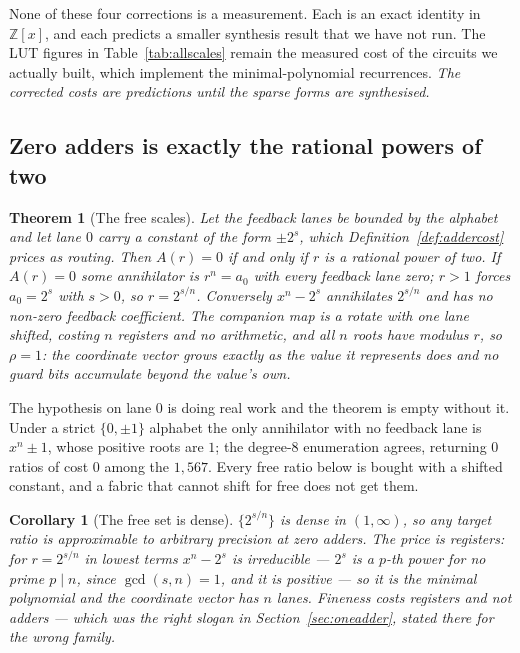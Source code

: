 \documentclass[11pt]{article}
\newtheorem{theorem}{Theorem}
\newtheorem{corollary}{Corollary}
\theoremstyle{definition}
\begin{document}
None of these four corrections is a measurement. Each is an exact identity in
$\mathbb{Z}[x]$, and each predicts a smaller synthesis result that we have not
run. The LUT figures in Table~\ref{tab:allscales} remain the measured cost of
the circuits we actually built, which implement the minimal-polynomial
recurrences. \emph{The corrected costs are predictions until the sparse forms
are synthesised.}

\subsection{Zero adders is exactly the rational powers of two}\label{sec:zeroadder}

\begin{theorem}[The free scales]\label{thm:zerocost}
Let the feedback lanes be bounded by the alphabet and let lane $0$ carry a
constant of the form $\pm2^{s}$, which Definition~\ref{def:addercost} prices as
routing. Then $A(r)=0$ if and only if $r$ is a rational power of two. If
$A(r)=0$ some annihilator is $r^{n}=a_0$ with every feedback lane zero; $r>1$
forces $a_0=2^{s}$ with $s>0$, so $r=2^{s/n}$. Conversely $x^{n}-2^{s}$
annihilates $2^{s/n}$ and has no non-zero feedback coefficient. The companion
map is a rotate with one lane shifted, costing $n$ registers and no arithmetic,
and all $n$ roots have modulus $r$, so $\rho=1$: the coordinate vector grows
exactly as the value it represents does and no guard bits accumulate beyond the
value's own.
\end{theorem}

The hypothesis on lane $0$ is doing real work and the theorem is empty without
it. Under a strict $\{0,\pm1\}$ alphabet the only annihilator with no feedback
lane is $x^{n}\pm1$, whose positive roots are $1$; the degree-$8$ enumeration
agrees, returning $0$ ratios of cost $0$ among the $1{,}567$. Every free ratio
below is bought with a shifted constant, and a fabric that cannot shift for free
does not get them.

\begin{corollary}[The free set is dense]\label{cor:dense}
$\{2^{s/n}\}$ is dense in $(1,\infty)$, so any target ratio is approximable to
arbitrary precision at zero adders. The price is registers: for $r=2^{s/n}$ in
lowest terms $x^{n}-2^{s}$ is irreducible --- $2^{s}$ is a $p$-th power for no
prime $p\mid n$, since $\gcd(s,n)=1$, and it is positive --- so it is the
minimal polynomial and the coordinate vector has $n$ lanes. Fineness costs
registers and not adders --- which was the right slogan in
Section~\ref{sec:oneadder}, stated there for the wrong family.
\end{corollary}
\end{document}
